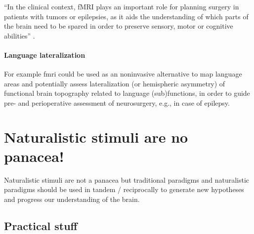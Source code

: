 ``In the clinical context, fMRI plays an important role for planning surgery in
patients with tumors or epilepsies, as it aids the understanding of which parts
of the brain need to be spared in order to preserve sensory, motor or cognitive
abilities'' \citep{wegrzyn2018thought}.


\paragraph{Language lateralization}


%
For example \ac{fmri} could be used as an noninvasive alternative to map
language areas and potentially assess lateralization (or hemispheric asymmetry)
of functional brain topography related to language (sub)functions, in order to
guide pre- and perioperative assessment of neurosurgery, e.g., in case of
epilepsy.






\section{Naturalistic stimuli are no panacea!}

%
Naturalistic stimuli are not a panacea but traditional paradigms and
naturalistic paradigms should be used in tandem / reciprocally to generate new
hypotheses and progress our understanding of the brain.



\subsection{Practical stuff}



